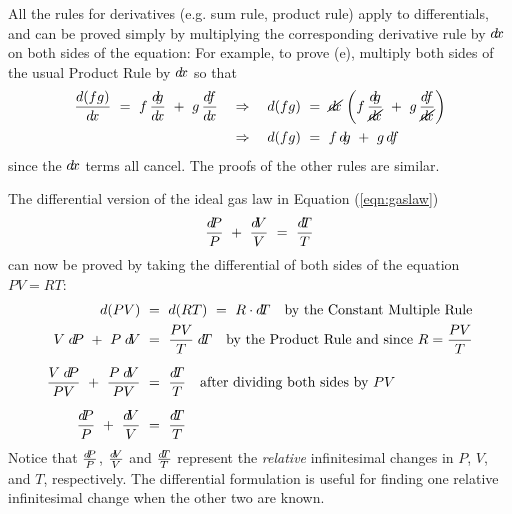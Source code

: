 All the rules for derivatives (e.g. sum rule, product rule) apply to
differentials, and can be proved simply by multiplying the corresponding
derivative rule by $d\!x$ on both sides of the equation:
\newpage
{}
For example, to prove (e), multiply both sides of the usual Product Rule by
$d\!x$ so that
\begin{align*}
\frac{d(fg)}{\dx} ~=~ f\,\frac{\dg}{\dx} ~+~ g\,\frac{\df}{\dx} \quad&\Rightarrow\quad
 d(fg) ~=~ \cancel{\dx}\,\left(f\,\frac{\dg}{\cancel{\dx}} ~+~
 g\,\frac{\df}{\cancel{\dx}}\right)\\
&\Rightarrow\quad d(fg) ~=~ f\,\dg ~+~ g\,\df \quad\checkmark
\end{align*}
since the $d\!x$ terms all cancel. The proofs of the other rules are similar.

The differential version of the ideal gas law in Equation (\ref{eqn:gaslaw})
\[
 \dfrac{d\negmedspace P}{P} ~+~ \dfrac{d\negmedspace V}{V} ~=~ \dfrac{d\negmedspace T}{T}
\]
can now be proved by taking the differential of both sides of the equation $PV = RT$:
\begin{align*}
 d(PV) ~&=~ d(RT) ~=~ R \cdot \dT \quad\text{by the Constant Multiple Rule}\\
 V \; \dP ~+~ P \; \dV ~&=~ \frac{PV}{T} \; \dT \quad\text{by the Product Rule and since
 $R = \frac{PV}{T}$}\\[6pt]
 \frac{V\;\dP}{PV} ~+~ \frac{P\;\dV}{PV} ~&=~ \frac{\dT}{T} \quad\text{after dividing both
 sides by $PV$}\\[6pt]
 \frac{\dP}{P} ~+~ \frac{\dV}{V} ~&=~ \frac{\dT}{T} \quad\checkmark
\end{align*}
Notice that $\frac{d\negmedspace P}{P}$, $\frac{d\negmedspace V}{V}$ and $\frac{d\negmedspace T}{T}$ represent
the \emph{relative} infinitesimal changes in $P$, $V$, and $T$, respectively.
The differential formulation is useful for finding one relative infinitesimal
change when the other two are known.

